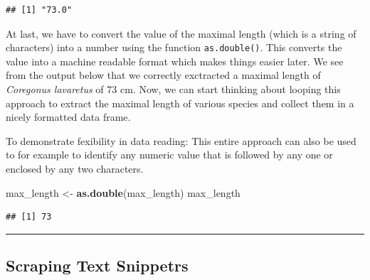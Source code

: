 \documentclass[
]{book}
\newenvironment{Shaded}{\begin{snugshade}}{\end{snugshade}}
\newcommand{\DataTypeTok}[1]{\textcolor[rgb]{0.13,0.29,0.53}{#1}}
\newcommand{\DecValTok}[1]{\textcolor[rgb]{0.00,0.00,0.81}{#1}}
\newcommand{\KeywordTok}[1]{\textcolor[rgb]{0.13,0.29,0.53}{\textbf{#1}}}
\newcommand{\NormalTok}[1]{#1}
\newcommand{\OperatorTok}[1]{\textcolor[rgb]{0.81,0.36,0.00}{\textbf{#1}}}
\newcommand{\StringTok}[1]{\textcolor[rgb]{0.31,0.60,0.02}{#1}}
\begin{document}
\begin{Shaded}
\end{Shaded}

\begin{verbatim}
## [1] "73.0"
\end{verbatim}

At last, we have to convert the value of the maximal length (which is a string of characters) into a number using the function \texttt{as.double()}. This converts the value into a machine readable format which makes things easier later. We see from the output below that we correctly exctracted a maximal length of \emph{Coregonus lavaretus} of 73 cm. Now, we can start thinking about looping this approach to extract the maximal length of various species and collect them in a nicely formatted data frame.

To demonstrate fexibility in data reading: This entire approach can also be used to for example to identify any numeric value that is followed by any one or enclosed by any two characters.

\begin{Shaded}
\begin{Highlighting}[]
\NormalTok{max_length <-}\StringTok{ }\KeywordTok{as.double}\NormalTok{(max_length)}
\NormalTok{max_length}
\end{Highlighting}
\end{Shaded}

\begin{verbatim}
## [1] 73
\end{verbatim}

\begin{center}\rule{0.5\linewidth}{0.5pt}\end{center}

\hypertarget{scraping-text-snippetrs}{%
\subsection{Scraping Text Snippetrs}\label{scraping-text-snippetrs}}
\end{document}
